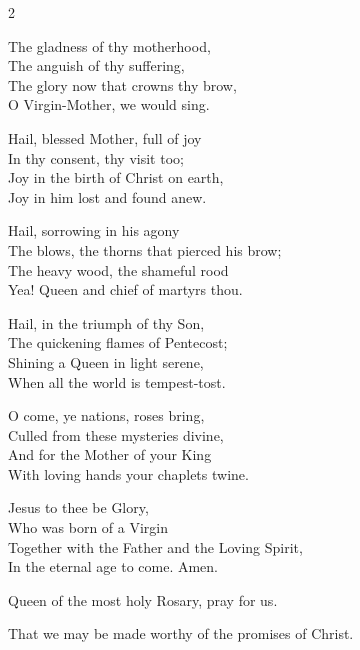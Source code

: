 \documentclass[12pt]{book}
\begin{document}
\myrule



\begin{multicols}{2}
\begin{enpars}
\raggedcolumns
The gladness of thy motherhood,\\
The anguish of thy suffering,\\
The glory now that crowns thy brow,\\
O Virgin-Mother, we would sing.

Hail, blessed Mother, full of joy\\
In thy consent, thy visit too;\\
Joy in the birth of Christ on earth,\\
Joy in him lost and found anew.

Hail, sorrowing in his agony\\
The blows, the thorns that pierced his brow;\\
The heavy wood, the shameful rood\\
Yea! Queen and chief of martyrs thou.

Hail, in the triumph of thy Son,\\
The quickening flames of Pentecost;\\
Shining a Queen in light serene,\\
When all the world is tempest-tost.

O come, ye nations, roses bring,\\
Culled from these mysteries divine,\\
And for the Mother of your King\\
With loving hands your chaplets twine.

Jesus to thee be Glory,\\
Who was born of a Virgin\\
Together with the Father and the Loving Spirit,\\
In the eternal age to come. Amen.
\end{enpars}
\end{multicols}

\myrule



\begin{enpars} \noindent \vv Queen of the most holy Rosary, pray for us.

\noindent \rr That we may be made worthy of the promises of Christ.
 \end{enpars}
 
\end{document}
